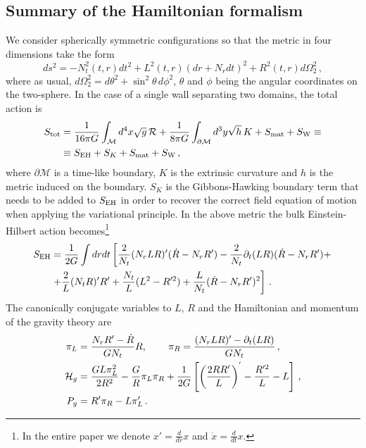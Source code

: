 \documentclass[11pt,a4paper]{article}
\begin{document}
\subsection{Summary of the Hamiltonian formalism}
\label{sec:SummaryHamiltonian}

We consider spherically symmetric configurations so that the metric in four dimensions take the form
\begin{equation}
\label{eq:4DMetric}
ds^{2} = -N_{t}^{2}(t,r)dt^{2}+L^{2}(t,r)(dr+N_{r}dt)^{2}+R^{2}(t,r)d\Omega_{2}^{2} \,,
\end{equation}
where as usual, $d \Omega_2^2 = d \theta^2 + \sin^2 \theta \, d \phi^2$, $\theta$ and $\phi$ being the angular coordinates on the two-sphere. In the case of a single wall separating two domains, the total action is
\begin{align}
\label{eq:4DAction}
S_{\rm tot} &= \frac{1}{16\pi G}\int_{{\cal M}}d^{4}x\sqrt{g} \,{\cal R}+\frac{1}{8\pi G}\int_{\partial{\cal M}}d^{3}y\sqrt{h} \, K+S_{\rm mat}+S_{\rm W} \equiv \nonumber \\
&\equiv S_{\rm EH} + S_K + S_{\rm mat} + S_{\rm W} \,,
\end{align}
where $\partial \mathcal{M}$ is a time-like boundary, $K$ is the extrinsic curvature and $h$ is the metric induced on the boundary. 
$S_{K}$ is the Gibbons-Hawking boundary term that needs to be added to $S_{\rm EH}$ in order to recover the correct field equation of motion when applying the variational principle. In the above metric the bulk Einstein-Hilbert action becomes\footnote{In the entire paper we denote $x'=\frac{d}{dr}x$ and $\dot{x}=\frac{d}{dt}x$.}
\begin{align}
S_{\rm EH} & = \frac{1}{2G}\int drdt\left[\frac{2}{N_{t}}(N_{r}LR)'(\dot{R}-N_{r}R')-\frac{2}{N_{t}}\partial_{t}(LR)(\dot{R}-N_{r}R')+ \right.\nonumber \\
&\left. +\frac{2}{L}(N_{t}R)'R' +\frac{N_{t}}{L}(L^{2}-R^{\prime 2})+\frac{L}{N_{t}}(\dot{R}-N_{r}R')^{2}\right] \,.
\label{eq:SEH}
\end{align}
The canonically conjugate variables to $L$, $R$ and the Hamiltonian
and momentum of the gravity theory are
\begin{align}
\label{eq:piLR}
\pi_{L} & = \frac{N_{r}R'-\dot{R}}{GN_{t}}R,\,\qquad \pi_{R}=\frac{(N_{r}LR)'-\partial_{t}(LR)}{GN_{t}} \,, \\
\label{eq:Hg}
{\cal H}_{g} & = \frac{GL\pi_{L}^{2}}{2R^{2}}-\frac{G}{R}\pi_{L}\pi_{R}+\frac{1}{2G}\left[\left(\frac{2RR'}{L}\right)^{'}-\frac{R'^{2}}{L}-L\right] \,, \\
\label{eq:Pg}
P_{g} & = R'\pi_{R}-L\pi_{L}' \,.
\end{align}
\end{document}

